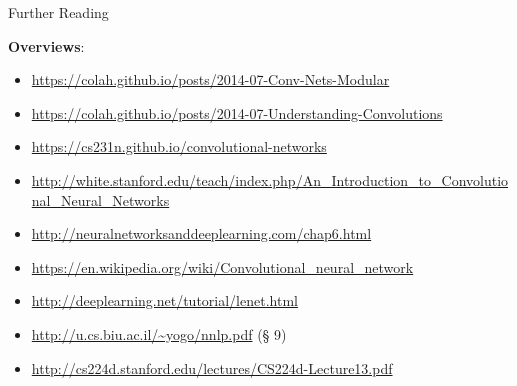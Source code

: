 \documentclass[xcolor=pdftex,x11names,table,hyperref]{beamer}
\begin{document}


\begin{frame}{Further Reading}

\textbf{Overviews}: \\[0.5em]
\begin{minipage}{1.1\textwidth}
\begin{tiny}
\begin{itemize}
	\item \url{https://colah.github.io/posts/2014-07-Conv-Nets-Modular}
	\item \url{https://colah.github.io/posts/2014-07-Understanding-Convolutions}
	\item \url{https://cs231n.github.io/convolutional-networks}
	\item \url{http://white.stanford.edu/teach/index.php/An_Introduction_to_Convolutional_Neural_Networks}
	\item \url{http://neuralnetworksanddeeplearning.com/chap6.html}
	\item \url{https://en.wikipedia.org/wiki/Convolutional_neural_network}
	\item \url{http://deeplearning.net/tutorial/lenet.html}
	\item \url{http://u.cs.biu.ac.il/~yogo/nnlp.pdf} (\S{} 9)
	\item \url{http://cs224d.stanford.edu/lectures/CS224d-Lecture13.pdf}
\end{itemize}
\end{tiny}
\end{minipage}


\end{frame}
\end{document}
